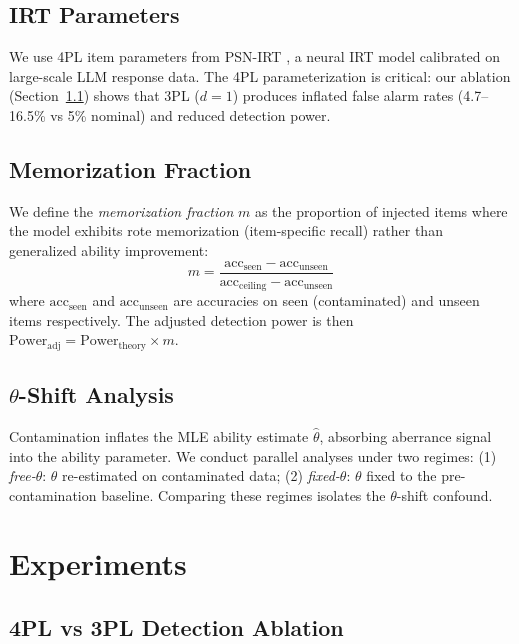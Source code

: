 \documentclass[11pt]{article}
\begin{document}
\subsection{IRT Parameters}

We use 4PL item parameters from PSN-IRT \citep{psnirt2026}, a neural IRT model calibrated on large-scale LLM response data. The 4PL parameterization is critical: our ablation (Section~\ref{sec:4pl_ablation}) shows that 3PL ($d=1$) produces inflated false alarm rates (4.7--16.5\% vs 5\% nominal) and reduced detection power.

\subsection{Memorization Fraction}

We define the \emph{memorization fraction} $m$ as the proportion of injected items where the model exhibits rote memorization (item-specific recall) rather than generalized ability improvement:
\begin{equation}
m = \frac{\text{acc}_{\text{seen}} - \text{acc}_{\text{unseen}}}{\text{acc}_{\text{ceiling}} - \text{acc}_{\text{unseen}}}
\end{equation}
where $\text{acc}_{\text{seen}}$ and $\text{acc}_{\text{unseen}}$ are accuracies on seen (contaminated) and unseen items respectively. The adjusted detection power is then $\text{Power}_{\text{adj}} = \text{Power}_{\text{theory}} \times m$.

\subsection{$\theta$-Shift Analysis}

Contamination inflates the MLE ability estimate $\hat{\theta}$, absorbing aberrance signal into the ability parameter. We conduct parallel analyses under two regimes: (1) \emph{free-$\theta$}: $\theta$ re-estimated on contaminated data; (2) \emph{fixed-$\theta$}: $\theta$ fixed to the pre-contamination baseline. Comparing these regimes isolates the $\theta$-shift confound.

\section{Experiments}
\label{sec:experiments}

\subsection{4PL vs 3PL Detection Ablation}
\label{sec:4pl_ablation}
\end{document}
